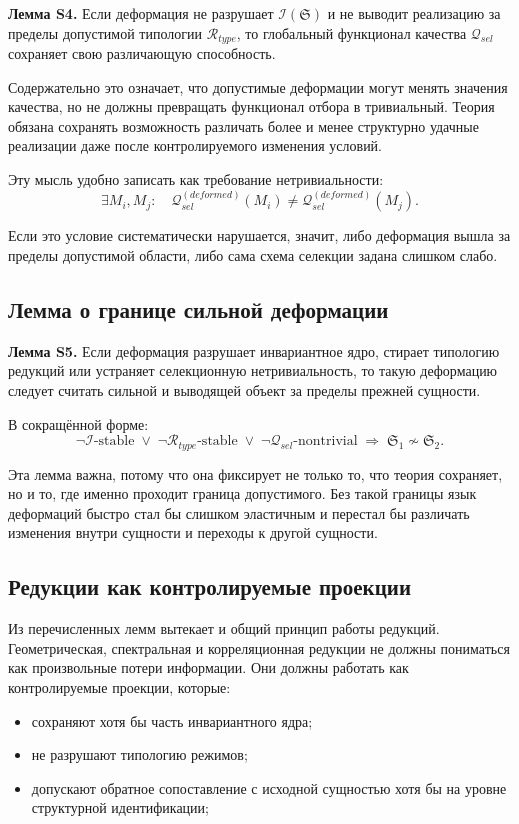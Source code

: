 \documentclass[12pt,a4paper]{article}
\begin{document}
\textbf{Лемма S4.} Если деформация не разрушает \(\mathcal{I}(\mathfrak{S})\) и не выводит реализацию за пределы допустимой типологии \(\mathcal{R}_{type}\), то глобальный функционал качества \(\mathcal{Q}_{sel}\) сохраняет свою различающую способность.

Содержательно это означает, что допустимые деформации могут менять значения качества, но не должны превращать функционал отбора в тривиальный. Теория обязана сохранять возможность различать более и менее структурно удачные реализации даже после контролируемого изменения условий.

Эту мысль удобно записать как требование нетривиальности:
\begin{equation}
\exists M_i,M_j:
\quad
\mathcal{Q}_{sel}^{(deformed)}(M_i)\neq \mathcal{Q}_{sel}^{(deformed)}(M_j).
\end{equation}

Если это условие систематически нарушается, значит, либо деформация вышла за пределы допустимой области, либо сама схема селекции задана слишком слабо.

\subsection{Лемма о границе сильной деформации}

\textbf{Лемма S5.} Если деформация разрушает инвариантное ядро, стирает типологию редукций или устраняет селекционную нетривиальность, то такую деформацию следует считать сильной и выводящей объект за пределы прежней сущности.

В сокращённой форме:
\begin{equation}
\neg \mathcal{I}\text{-stable}
\;\vee\;
\neg \mathcal{R}_{type}\text{-stable}
\;\vee\;
\neg \mathcal{Q}_{sel}\text{-nontrivial}
\;\Longrightarrow\;
\mathfrak{S}_1 \not\sim \mathfrak{S}_2.
\end{equation}

Эта лемма важна, потому что она фиксирует не только то, что теория сохраняет, но и то, где именно проходит граница допустимого. Без такой границы язык деформаций быстро стал бы слишком эластичным и перестал бы различать изменения внутри сущности и переходы к другой сущности.

\subsection{Редукции как контролируемые проекции}

Из перечисленных лемм вытекает и общий принцип работы редукций. Геометрическая, спектральная и корреляционная редукции не должны пониматься как произвольные потери информации. Они должны работать как контролируемые проекции, которые:
\begin{itemize}
    \item сохраняют хотя бы часть инвариантного ядра;
    \item не разрушают типологию режимов;
    \item допускают обратное сопоставление с исходной сущностью хотя бы на уровне структурной идентификации;
\end{itemize}
\end{document}
